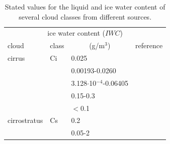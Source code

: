 \begin{table}[!htb]
\begin{center}
\begin{tabular}{llll}
\multicolumn{4}{c}{ice water content ($IWC$)}  \\
 cloud        & class & \multicolumn{1}{c}{(g/m$^3$)} & reference\\
\hline
 cirrus       & Ci    & 0.025                         & \citet{salby:96}\\
              &       & 0.00193-0.0260                & \citet{hess:98}\\
              &       & 3.128$\cdot$10$^{-4}$-0.06405 & \citet{abreu:96}\\ 
              &       & 0.15-0.3                      & \citet{larsenetal:98}\\
              &       & $<$0.1                        & \citet{berton:00}\\
cirrostratus  & Cs    & 0.2                           & \citet{salby:96}\\
              &       & 0.05-2                        & \citet{berton:00}\\
\hline
\end{tabular}
\caption{Stated values for the liquid and ice water content of several 
  cloud classes from different sources.}
\label{tab:lwc}
\end{center}
\end{table}

